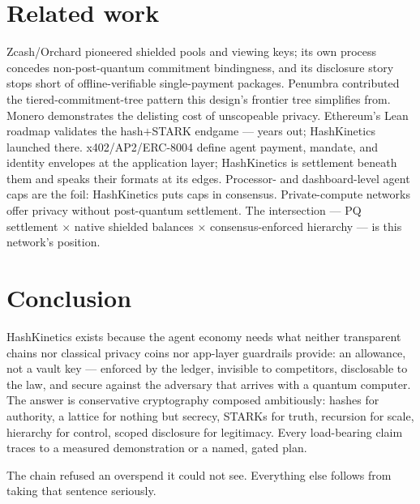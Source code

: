\documentclass[11pt]{article}
\begin{document}
\section{Related work}
Zcash/Orchard pioneered shielded pools and viewing keys; its own process concedes non-post-quantum commitment bindingness, and its disclosure story stops short of offline-verifiable single-payment packages. Penumbra contributed the tiered-commitment-tree pattern this design's frontier tree simplifies from. Monero demonstrates the delisting cost of unscopeable privacy. Ethereum's Lean roadmap validates the hash$+$STARK endgame --- years out; HashKinetics launched there. x402/AP2/ERC-8004 define agent payment, mandate, and identity envelopes at the application layer; HashKinetics is settlement beneath them and speaks their formats at its edges. Processor- and dashboard-level agent caps are the foil: HashKinetics puts caps in consensus. Private-compute networks offer privacy without post-quantum settlement. The intersection --- PQ settlement $\times$ native shielded balances $\times$ consensus-enforced hierarchy --- is this network's position.

\section{Conclusion}
HashKinetics exists because the agent economy needs what neither transparent chains nor classical privacy coins nor app-layer guardrails provide: an allowance, not a vault key --- enforced by the ledger, invisible to competitors, disclosable to the law, and secure against the adversary that arrives with a quantum computer. The answer is conservative cryptography composed ambitiously: hashes for authority, a lattice for nothing but secrecy, STARKs for truth, recursion for scale, hierarchy for control, scoped disclosure for legitimacy. Every load-bearing claim traces to a measured demonstration or a named, gated plan.

The chain refused an overspend it could not see. Everything else follows from taking that sentence seriously.
\end{document}
